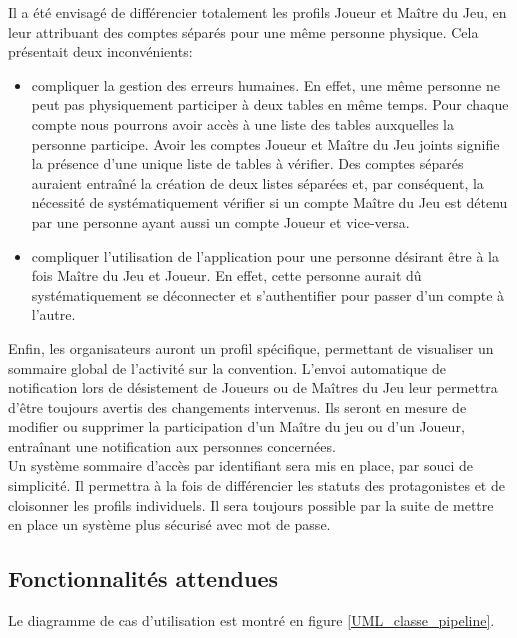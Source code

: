 \documentclass[11pt]{article}
\begin{document}
\indent Il a été envisagé de différencier totalement les profils Joueur et Maître du Jeu, en leur attribuant des comptes séparés pour une même personne physique. Cela présentait deux inconvénients:
\begin{itemize}
\item{compliquer la gestion des erreurs humaines. En effet, une même personne ne peut pas physiquement participer à deux tables en même temps. Pour chaque compte nous pourrons avoir accès à une liste des tables auxquelles la personne participe. Avoir les comptes Joueur et Maître du Jeu joints signifie la présence d'une unique liste de tables à vérifier. Des comptes séparés auraient entraîné la création de deux listes séparées et, par conséquent, la nécessité de systématiquement vérifier si un compte Maître du Jeu est détenu par une personne ayant aussi un compte Joueur et vice-versa.}
\item{compliquer l'utilisation de l'application pour une personne désirant être à la fois Maître du Jeu et Joueur. En effet, cette personne aurait dû systématiquement se déconnecter et s'authentifier pour passer d'un compte à l'autre.\\}
\end{itemize}

Enfin, les organisateurs auront un profil spécifique, permettant de visualiser un sommaire global de l'activité sur la convention. L'envoi automatique de notification lors de désistement de Joueurs ou de Maîtres du Jeu leur permettra d'être toujours avertis des changements intervenus. Ils seront en mesure de modifier ou supprimer la participation d'un Maître du jeu ou d'un Joueur, entraînant une notification aux personnes concernées.\\

Un système sommaire d'accès par identifiant sera mis en place, par souci de simplicité. Il permettra à la fois de différencier les statuts des protagonistes et de cloisonner les profils individuels. Il sera toujours possible par la suite de mettre en place un système plus sécurisé avec mot de passe. \\



\subsection{Fonctionnalités attendues}

Le diagramme de cas d'utilisation est montré en figure \ref{UML_classe_pipeline}. \\
\end{document}
